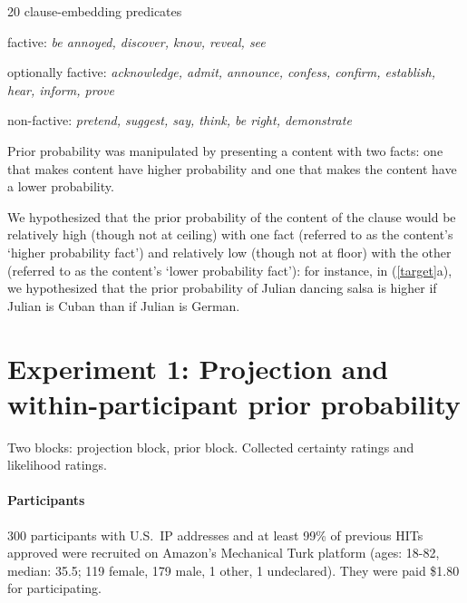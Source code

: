 \documentclass[11pt,fleqn]{article}
\newcommand{\6}{\mbox{$[\hspace*{-.6mm}[$}}
\newcommand{\9}{\mbox{$]\hspace*{-.6mm}]$}}
\begin{document}
\begin{exe}
\ex\label{pred} 20 clause-embedding predicates 

\begin{xlist}

\ex factive: {\em be annoyed, discover, know, reveal, see}

\ex optionally factive: {\em acknowledge, admit, announce, confess, confirm, establish, hear, inform, prove}

\ex non-factive:  {\em pretend, suggest, say, think, be right, demonstrate}

\end{xlist}

\end{exe}

Prior probability was manipulated by presenting a content with two facts: one that makes content have higher probability and one that makes the content have a lower probability.

We hypothesized that the prior probability of the content of the clause would be relatively high (though not at ceiling) with one fact (referred to as the content's `higher probability fact') and relatively low (though not at floor) with the other (referred to as the content's `lower probability fact'): for instance, in (\ref{target}a), we hypothesized that the prior probability of Julian dancing salsa is higher if Julian is Cuban than if Julian is German.

\newpage

\section{Experiment 1: Projection and within-participant prior probability}

Two blocks: projection block, prior block. Collected certainty ratings and likelihood ratings.

\paragraph{Participants} 300 participants with U.S.\ IP addresses and at least 99\% of previous HITs approved were recruited on Amazon's Mechanical Turk platform (ages: 18-82, median: 35.5; 119 female, 179 male, 1 other, 1 undeclared). They were paid \$1.80 for participating.
\end{document}
